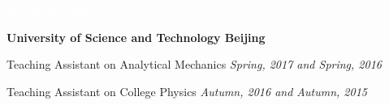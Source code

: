 \documentclass[12pt,a4paper,utf8]{report}
\begin{document}
\begin{minipage}[t]{16cm}
    \begin{snugshade}{\textcolor{white}{\textsf{\quad 
        WORK EXPERIENCE
    \qquad}}}\end{snugshade}
\end{minipage}\par
\vspace{0.2cm}\hspace{0.5cm}
\begin{minipage}[t]{15cm}
    {{\textbf{University of Science and Technology Beijing}}}\par
    \quad Teaching Assistant on Analytical Mechanics\hfill
    {\em{Spring, 2017 and Spring, 2016}}\par
    \quad Teaching Assistant on College Physics\hfill
    {\em{Autumn, 2016 and Autumn, 2015}}\par
\end{minipage}\par
\vspace{0.4cm}
\end{document}
